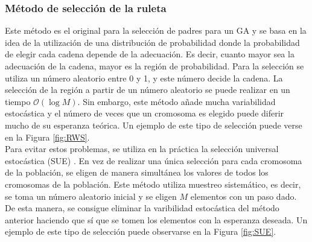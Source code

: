 \subsubsection{Método de selección de la ruleta}
Este método es el original para la selección de padres para un GA y se basa en la idea de la utilización de una distribución de probabilidad donde la probabilidad de elegir cada cadena depende de la adecuación. Es decir, cuanto mayor sea la adecuación de la cadena, mayor es la región de probabilidad. Para la selección se utiliza un número aleatorio entre 0 y 1, y este número decide la cadena. La selección de la región a partir de un número aleatorio se puede realizar en un tiempo $\mathcal{O}(\log M)$. Sin embargo, este método añade mucha variabilidad estocástica y el número de veces que un cromosoma es elegido puede diferir mucho de su esperanza teórica. Un ejemplo de este tipo de selección puede verse en la Figura \ref{fig:RWS}.\\

Para evitar estos problemas, se utiliza en la práctica la selección universal estocástica (SUE) \cite{beranek-1987}. En vez de realizar una única selección para cada cromosoma de la población, se eligen de manera simultánea los valores de todos los cromosomas de la población. Este método utiliza muestreo sistemático, es decir, se toma un número aleatorio inicial y se eligen $M$ elementos con un paso dado. De esta manera, se consigue eliminar la varibilidad estocástica del método anterior haciendo que sí que se tomen los elementos con la esperanza deseada. Un ejemplo de este tipo de selección puede observarse en la Figura \ref{fig:SUE}.\\

